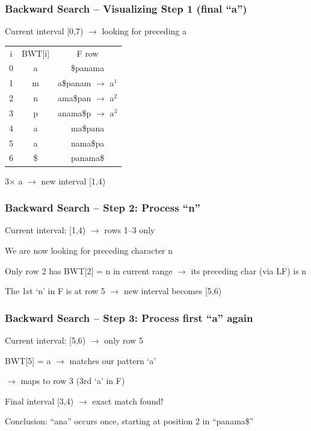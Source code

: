 \documentclass[
11pt, %
aspectratio=169, %
]{beamer}
\begin{document}
\begin{frame}
\frametitle{Backward Search – Visualizing Step 1 (final ``a'')}
Current interval [0,7) $\rightarrow$ looking for preceding \alert{a}

\begin{center}
\small
\begin{tabular}{c|c|c}
i & BWT[i] & F row \\
0 & \alert{a} & \$panama \\
1 & m         & a\$panam $\rightarrow$ a$^{1}$ \\
2 & n         & ama\$pan $\rightarrow$ a$^{2}$ \\
3 & p         & anama\$p $\rightarrow$ a$^{3}$ \\
4 & \alert{a} & ma\$pana \\
5 & \alert{a} & nama\$pa \\
6 & \$        & panama\$ \\
\end{tabular}
\end{center}

3× a $\rightarrow$ new interval [1,4)
\end{frame}

\begin{frame}
\frametitle{Backward Search – Step 2: Process ``n''}

Current interval: [1,4) $\to$ rows 1–3 only

We are now looking for preceding character \alert{n}

\bigskip
Only row 2 has BWT[2] = n in current range $\to$ its preceding char (via LF) is n

\bigskip
The 1st `n' in F is at row 5 $\to$ new interval becomes [5,6)
\end{frame}


\begin{frame}
\frametitle{Backward Search – Step 3: Process first ``a'' again}

Current interval: [5,6) $\to$ only row 5

BWT[5] = a $\to$ matches our pattern `a'

$\to$ maps to row 3 (3rd `a' in F)

\bigskip
Final interval [3,4) $\to$ exact match found!

\bigskip
\alert{Conclusion:} ``ana'' occurs once, starting at position 2 in ``panama\$''
\end{frame}
\end{document}
